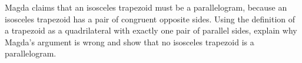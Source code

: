Magda claims that an isosceles trapezoid must be a parallelogram, because an isosceles trapezoid has a pair of congruent opposite sides. Using the definition of a trapezoid as a quadrilateral with exactly one pair of parallel sides, explain why Magda's argument is wrong and show that no isosceles trapezoid is a parallelogram.
